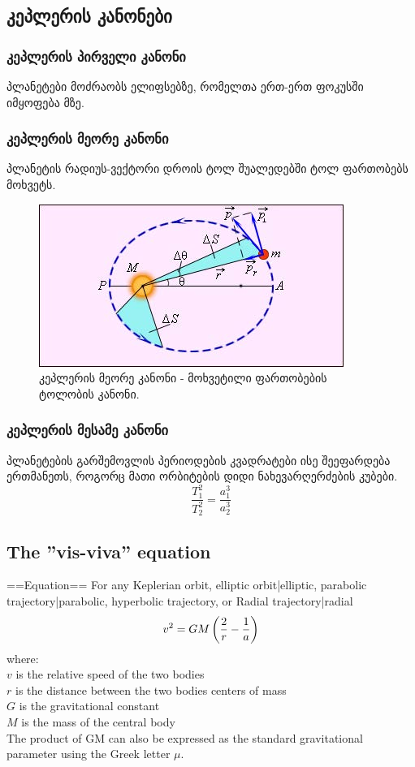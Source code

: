\documentclass{book}
\begin{document}
\subsection{კეპლერის კანონები}%
\subsubsection{კეპლერის პირველი კანონი}
	პლანეტები მოძრაობს ელიფსებზე, რომელთა ერთ-ერთ ფოკუსში იმყოფება მზე.
\subsubsection{კეპლერის მეორე კანონი}
პლანეტის რადიუს-ვექტორი დროის ტოლ შუალედებში ტოლ ფართობებს მოხვეტს.
		\begin{figure}[H]
		   \centering
           \includegraphics[width=0.5\columnwidth]{figures/kepler_2_law}
           \caption{კეპლერის მეორე კანონი - მოხვეტილი ფართობების ტოლობის კანონი.}
           \label{fig:kepler_2_law}
        \end{figure}
	
\subsubsection{კეპლერის მესამე კანონი}
	პლანეტების გარშემოვლის პერიოდების კვადრატები ისე შეეფარდება ერთმანეთს, როგორც მათი ორბიტების დიდი ნახევარღერძების კუბები.
	\begin{equation}
		\frac{T_1^2}{T_2^2} = \frac{a_1^3}{a_2^3}
	\end{equation}

\subsection{The ''vis-viva'' equation}
==Equation==
For any Keplerian orbit, elliptic orbit|elliptic, parabolic trajectory|parabolic, hyperbolic trajectory, or Radial trajectory|radial 
	\begin{equation}
		v^2 = GM \left({ 2 \over r} - {1 \over a}\right)
	\end{equation}
where: \\
$v$ is the relative speed of the two bodies \\
$r$ is the distance between the two bodies centers of mass\\
$G$ is the gravitational constant \\
$M$ is the mass of the central body \\
The product of GM can also be expressed as the standard gravitational parameter using the Greek letter $\mu$.
	
\end{document}
